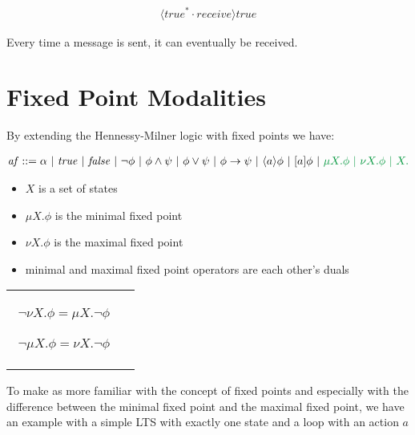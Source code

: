 \documentclass{clseminar}
\begin{document}
  \begin{align*}
    [\mathit{true}^*\cdot \mathit{send}]\langle \mathit{true}^* \cdot \mathit{receive} \rangle \mathit{true}
  \end{align*}

  Every time a message is sent, it can eventually be received.

  \section{Fixed Point Modalities}

  By extending the Hennessy-Milner logic with fixed points we have:

  \begin{align*}
    \mathit{af} ::= \alpha\ |\ \mathit{true}\ |\ \mathit{false}\ |\ \neg \phi\ |\ \phi \land \psi\ |\ \phi \lor \psi\ |\ \phi \to \psi\ |\ \langle a \rangle \phi \ |\ [a]\phi\ |\ \color{green} \mu X. \phi \ |\ \nu X. \phi \ |\ X.
  \end{align*}

  \begin{itemize}
    \item $X$ is a set of states
    \item $\mu X. \phi$ is the minimal fixed point
    \item $\nu X. \phi$ is the maximal fixed point
    \item minimal and maximal fixed point operators are each other's duals
  \end{itemize}
  \begin{tabular}{cc}
    \begin{minipage}{.47\linewidth}
      \begin{align*}
        \neg \nu X. \phi = \mu X. \neg \phi
      \end{align*}
    \end{minipage}
    \begin{minipage}{.47\linewidth}
      \begin{align*}
        \neg \mu X. \phi = \nu X. \neg \phi
      \end{align*}
    \end{minipage}
  \end{tabular}

  To make as more familiar with the concept of fixed points and especially with the difference between the minimal fixed point and the maximal fixed point, we have an example with a simple LTS with exactly one state and a loop with an action $a$ \\
\end{document}
